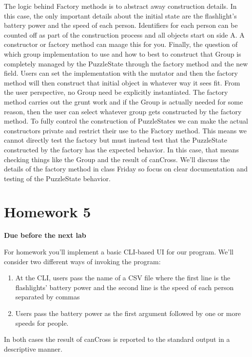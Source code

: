 \documentclass[nobib]{tufte-handout}
\begin{document}
The logic behind Factory methods is to abstract away construction details. In this case, the only important details about the initial state are the flashlight's battery power and the speed of each person. Identifiers for each person can be counted off as part of the construction process and all objects start on side A. A constructor or factory method can maage this for you. Finally, the question of which group implementation to use and how to best to construct that Group is completely managed by the PuzzleState through the factory method and the new field. Users can set the implementation with the mutator and then the factory method will then construct that initial object in whatever way it sees fit. From the user perspective, no Group need be explicitly instantiated. The factory method carries out the grunt work and if the Group is actually needed for some reason, then the user can select whatever group gets constructed by the factory method. To fully control the construction of PuzzleStates we can make the actual constructors private and restrict their use to the Factory method. This means we cannot directly test the factory but must instead test that the PuzzleState constructed by the factory has the expected behavior. In this case, that means checking things like the Group and the result of canCross. We'll discuss the details of the factory method in class Friday so focus on clear documentation and testing of the PuzzleState behavior. 

\section{Homework 5}

\begin{center}
\textbf{Due before the next lab}
\end{center}

For homework you'll implement a basic CLI-based UI for our program. We'll consider two different ways of invoking the program:
\begin{enumerate}
\item At the CLI, users pass the name of a CSV file where the first line is the flashlights' battery power and the second line is the speed of each person separated by commas
\item Users pass the battery power as the first argument followed by one or more speeds for people. 
\end{enumerate} 
In both cases the result of canCross is reported to the standard output in a descriptive manner. 
\end{document}
